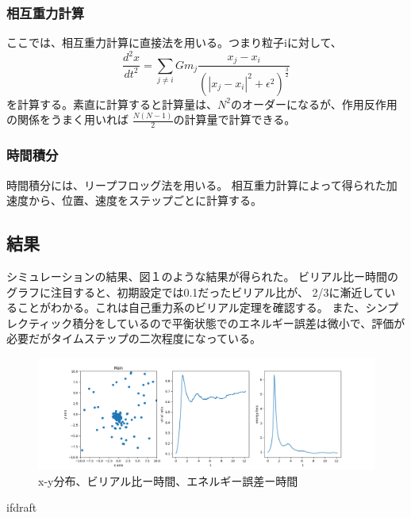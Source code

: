 \documentclass{jsarticle}
\begin{document}
\subsubsection{相互重力計算}
ここでは、相互重力計算に直接法を用いる。つまり粒子iに対して、
\begin {equation}
    \frac{d^2x}{dt^2} = \sum_{j \neq i} G m_j \frac{x_j - x_i}{(|x_j - x_i|^2 + \epsilon^2)^\frac{3}{2}}
\end{equation}
を計算する。素直に計算すると計算量は、$N^2$のオーダーになるが、作用反作用の関係をうまく用いれば
$\frac{N(N-1)}{2}$の計算量で計算できる。

\subsubsection{時間積分}
時間積分には、リープフロッグ法を用いる。
相互重力計算によって得られた加速度から、位置、速度をステップごとに計算する。
\subsection {結果}
シミュレーションの結果、図１のような結果が得られた。
ビリアル比ー時間のグラフに注目すると、初期設定では0.1だったビリアル比が、
2/3に漸近していることがわかる。これは自己重力系のビリアル定理を確認する。
また、シンプレクティック積分をしているので平衡状態でのエネルギー誤差は微小で、評価が必要だがタイムステップの二次程度になっている。
\begin{figure}[b]
    \label{fig:result}
    \includegraphics[width=\textwidth,natwidth=1000,natheight=642]{fig.png}
    \caption{x-y分布、ビリアル比ー時間、エネルギー誤差ー時間}
\end{figure}
\expandafter\ifx\csname ifdraft\endcsname\relax
  
\end{document}
